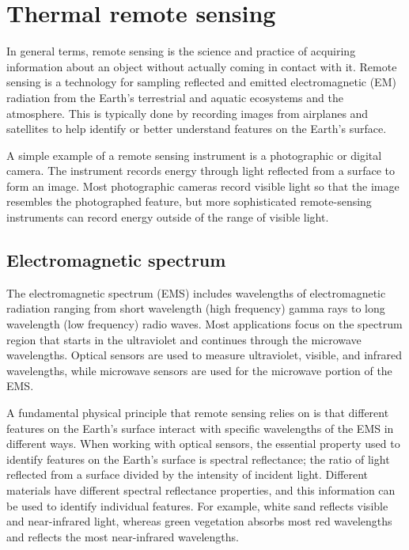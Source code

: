     
\section{Thermal remote sensing} \label{sec:thermal_remote_sensing}

In general terms, remote sensing is the science and practice of acquiring information about an object without actually coming in contact with it.
Remote sensing is a technology for sampling reflected and emitted electromagnetic (EM) radiation from the Earth's terrestrial and aquatic ecosystems and the atmosphere.
This is typically done by recording images from airplanes and satellites to help identify or better understand features on the Earth's surface.

A simple example of a remote sensing instrument is a photographic or digital camera.
The instrument records energy through light reflected from a surface to form an image.
Most photographic cameras record visible light so that the image resembles the photographed feature, but more sophisticated remote-sensing instruments can record energy outside of the range of visible light.

    \subsection{Electromagnetic spectrum}

    The electromagnetic spectrum (EMS) includes wavelengths of electromagnetic radiation ranging from short wavelength (high frequency) gamma rays to long wavelength (low frequency) radio waves. 
    Most applications focus on the spectrum region that starts in the ultraviolet and continues through the microwave wavelengths. 
    Optical sensors are used to measure ultraviolet, visible, and infrared wavelengths, while microwave sensors are used for the microwave portion of the EMS.
    
    A fundamental physical principle that remote sensing relies on is that different features on the Earth's surface interact with specific wavelengths of the EMS in different ways.
    When working with optical sensors, the essential property used to identify features on the Earth's surface is spectral reflectance; the ratio of light reflected from a surface divided by the intensity of incident light. Different materials have different spectral reflectance properties, and this information can be used to identify individual features.
    For example, white sand reflects visible and near-infrared light, whereas green vegetation absorbs most red wavelengths and reflects the most near-infrared wavelengths.    

